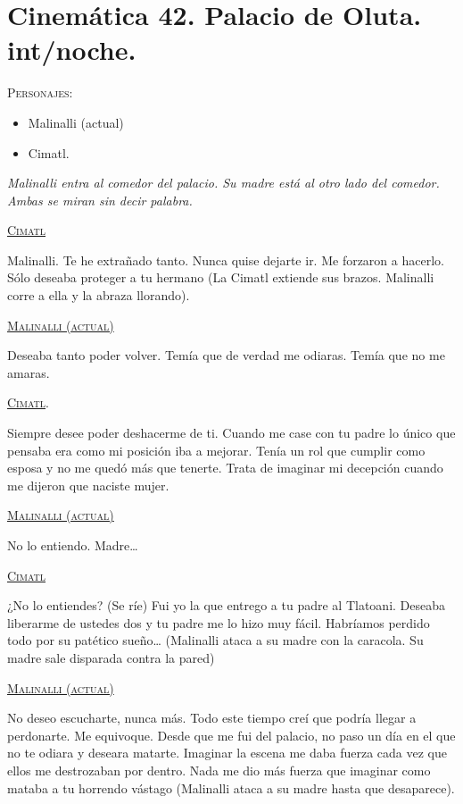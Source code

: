 \documentclass[11pt,letterpaper]{article}
\begin{document}
\section{Cinemática 42. Palacio de Oluta. int/noche. }
 \textsc{Personajes}:
 \begin{itemize}
 \item Malinalli (actual)
 \item Cimatl.
 \end{itemize}
\textit{Malinalli entra al comedor del palacio. Su madre está al otro lado del comedor. Ambas se miran sin decir palabra. }
\begin{center}
\textsc{\underline{Cimatl}}
\\
\par
Malinalli. Te he extrañado tanto. Nunca quise dejarte ir. Me forzaron a hacerlo. Sólo deseaba proteger a tu hermano (La Cimatl extiende sus brazos. Malinalli corre a ella y la abraza llorando).
\\
\par
\textsc{\underline{Malinalli (actual)}}
\\
\par
Deseaba tanto poder volver. Temía que de verdad me odiaras. Temía que no me amaras.
\\
\par
\textsc{\underline{Cimatl}}.
\\
\par
Siempre desee poder deshacerme de ti. Cuando me case con tu padre lo único que pensaba era como mi posición iba a mejorar. Tenía un rol que cumplir como esposa y no me quedó más que tenerte. Trata de imaginar mi decepción cuando me dijeron que naciste mujer. 
\\
\par
\textsc{\underline{Malinalli (actual)}}
\\
\par
No lo entiendo. Madre…
\\
\par
\textsc{\underline{Cimatl}}
\\
\par
¿No lo entiendes? (Se ríe) Fui yo la que entrego a tu padre al Tlatoani. Deseaba liberarme de ustedes dos y tu padre me lo hizo muy fácil. Habríamos perdido todo por su patético sueño… (Malinalli ataca a su madre con la caracola. Su madre sale disparada contra la pared)
\\
\par
\textsc{\underline{Malinalli (actual)}}
\\
\par
No deseo escucharte, nunca más. Todo este tiempo creí que podría llegar a perdonarte. Me equivoque. Desde que me fui del palacio, no paso un día en el que no te odiara y deseara matarte. Imaginar la escena me daba fuerza cada vez que ellos me destrozaban por dentro. Nada me dio más fuerza que imaginar como mataba a tu horrendo vástago (Malinalli ataca a su madre hasta que desaparece).   
\end{center}
\end{document}
